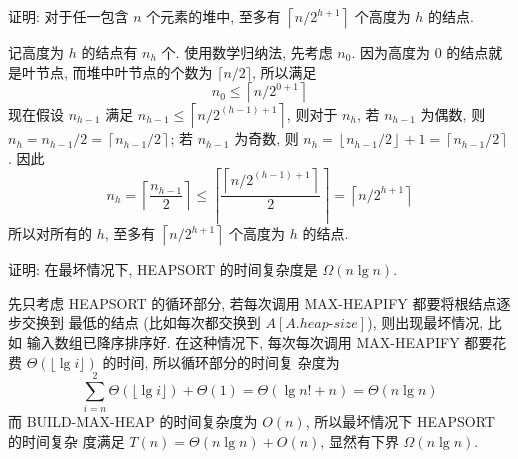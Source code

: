 \documentclass[boxes]{homework}
\begin{document}
\begin{problem}
证明: 对于任一包含 $n$ 个元素的堆中, 至多有 $\left\lceil n / 2^{h + 1}
    \right\rceil$ 个高度为 $h$ 的结点.
\end{problem}
\begin{solution}
    记高度为 $h$ 的结点有 $n_{h}$ 个. 使用数学归纳法, 先考虑 $n_{0}$. 因为高度为
    0 的结点就是叶节点, 而堆中叶节点的个数为 $\lceil n / 2 \rceil$, 所以满足
    \begin{equation}
        n_{0} \leqslant \left\lceil n / 2^{0 + 1} \right\rceil
    \end{equation}
    现在假设 $n_{h - 1}$ 满足 $n_{h - 1} \leqslant \left\lceil n / 2^{(h - 1)+1}
        \right\rceil$, 则对于 $n_{h}$, 若 $n_{h - 1}$ 为偶数, 则 $n_{h} =
        n_{h - 1} / 2 = \left\lceil n_{h - 1} / 2 \right\rceil$; 若 $n_{h - 1}$
    为奇数, 则 $n_{h} = \left\lfloor n_{h - 1} / 2 \right\rfloor + 1 =
        \left\lceil n_{h - 1} / 2 \right\rceil$. 因此
    \begin{equation}
        n_{h} = \left\lceil \frac{ n_{h - 1} }{ 2 } \right\rceil
        \leqslant \left\lceil \frac{ \left\lceil n / 2^{(h - 1) + 1} \right\rceil }
        { 2 } \right\rceil
        = \left\lceil n / 2^{h + 1} \right\rceil
    \end{equation}
    所以对所有的 $h$, 至多有 $\left\lceil n / 2^{h + 1}\right\rceil$ 个高度为
    $h$ 的结点.
\end{solution}

\begin{problem}
证明: 在最坏情况下, HEAPSORT 的时间复杂度是 $\Omega(n\lg n)$.
\end{problem}
\begin{solution}
    先只考虑 HEAPSORT 的循环部分, 若每次调用 MAX-HEAPIFY 都要将根结点逐步交换到
    最低的结点 (比如每次都交换到 $A[A.heap\text{-}size]$), 则出现最坏情况, 比如
    输入数组已降序排序好. 在这种情况下, 每次每次调用 MAX-HEAPIFY 都要花费
    $\Theta  \left( \lfloor \lg i \rfloor\right)$ 的时间, 所以循环部分的时间复
    杂度为
    \begin{equation}
        \sum_{i = n}^{2} \Theta \left( \lfloor \lg i \rfloor \right) + \Theta(1)
        = \Theta \left( \lg n! + n\right)
        = \Theta \left( n \lg n\right)
    \end{equation}
    而 BUILD-MAX-HEAP 的时间复杂度为 $O(n)$, 所以最坏情况下 HEAPSORT 的时间复杂
    度满足 $T(n) = \Theta(n\lg n) + O(n)$, 显然有下界 $\Omega(n\lg n)$.
\end{solution}
\end{document}
